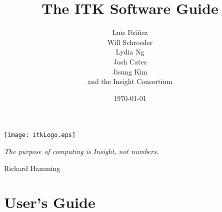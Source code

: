 \documentclass{InsightSoftwareGuide}
\title{The ITK Software Guide}
\author{Luis Ib\'{a}\~{n}ez\\Will Schroeder\\Lydia Ng\\Josh Cates\\Jisung Kim\\and the Insight Consortium}
\date{\today}
\newif\ifitkFullVersion
\begin{document}
\maketitle

\frontmatter




%
%
\newpage

\begin{minipage}[t][10cm][b]{\textwidth}
\center
\texttt{[image: itkLogo.eps]}
\large
\begin{center}
\emph{The purpose of computing is Insight, not numbers.}\\
\end{center}
\hspace{8cm} Richard Hamming
\normalsize
\end{minipage}

\newpage




\ifitkFullVersion 


\fi

%
%

\small
\tableofcontents
\listoffigures
\listoftables
\normalsize


% 
% 

\mainmatter

\ifitkFullVersion
\part{Introduction}




\fi


\part{User's Guide}

\ifitkFullVersion

\fi

\ifitkFullVersion

\fi

\ifitkFullVersion

\fi
\end{document}
